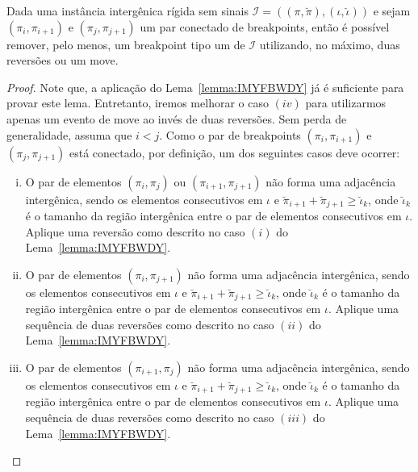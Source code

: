 \begin{lemma}\label{lemma:NWNNZGXH}
Dada uma instância intergênica rígida sem sinais $\mathcal{I} = ((\pi,\breve\pi),(\iota,\breve\iota))$ e sejam $(\pi_i,\pi_{i+1})$ e $(\pi_j,\pi_{j+1})$ um par conectado de breakpoints, então é possível remover, pelo menos, um breakpoint tipo um de $\mathcal{I}$ utilizando, no máximo, duas reversões ou um move.
\end{lemma}
\begin{proof}
Note que, a aplicação do Lema~\ref{lemma:IMYFBWDY} já é suficiente para provar este lema. Entretanto, iremos melhorar o caso $(iv)$ para utilizarmos apenas um evento de move ao invés de duas reversões. Sem perda de generalidade, assuma que $i < j$. Como o par de breakpoints $(\pi_i,\pi_{i+1})$ e $(\pi_j,\pi_{j+1})$ está conectado, por definição, um dos seguintes casos deve ocorrer:
\begin{enumerate}[i.]
  \item O par de elementos $(\pi_i,\pi_{j})$ ou $(\pi_{i+1},\pi_{j+1})$ não forma uma adjacência intergênica, sendo os elementos consecutivos em $\iota$ e $\breve\pi_{i+1} + \breve\pi_{j+1} \ge \breve\iota_k$, onde $\breve\iota_k$ é o tamanho da região intergênica entre o par de elementos consecutivos em $\iota$. Aplique uma reversão como descrito no caso $(i)$ do Lema~\ref{lemma:IMYFBWDY}.   
  \item O par  de elementos $(\pi_i,\pi_{j+1})$ não forma uma adjacência intergênica, sendo os elementos consecutivos em $\iota$ e $\breve\pi_{i+1} + \breve\pi_{j+1} \ge \breve\iota_k$, onde $\breve\iota_k$ é o tamanho da região intergênica entre o par de elementos consecutivos em $\iota$. Aplique uma sequência de duas reversões como descrito no caso $(ii)$ do Lema~\ref{lemma:IMYFBWDY}.
  \item O par de elementos $(\pi_{i+1},\pi_{j})$ não forma uma adjacência intergênica, sendo os elementos consecutivos em $\iota$ e $\breve\pi_{i+1} + \breve\pi_{j+1} \ge \breve\iota_k$, onde $\breve\iota_k$ é o tamanho da região intergênica entre o par de elementos consecutivos em $\iota$. Aplique uma sequência de duas reversões como descrito no caso $(iii)$ do Lema~\ref{lemma:IMYFBWDY}.

\end{enumerate}
\end{proof}
